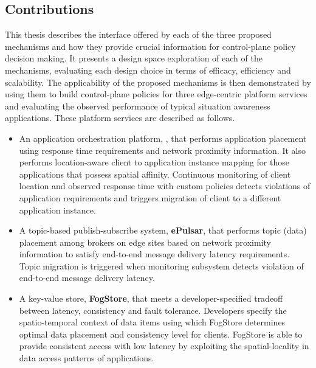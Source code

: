 \subsection{Contributions}
This thesis describes the interface offered by each of the three proposed mechanisms and how they provide crucial information for control-plane policy decision making. It presents a design space exploration of each of the mechanisms, evaluating each design choice in terms of efficacy, efficiency and scalability. The applicability of the proposed mechanisms is then demonstrated by using them to build control-plane policies for three edge-centric platform services and evaluating the observed performance of typical situation awareness applications. These platform services are described as follows.
\begin{itemize}
\item An application orchestration platform, \oneedge{}, that performs application placement using response time requirements and network proximity information. It also performs location-aware client to application instance mapping for those applications that possess spatial affinity. Continuous monitoring of client location and observed response time with custom policies detects violations of application requirements and triggers migration of client to a different application instance. 
\item A topic-based publish-subscribe system, \textbf{ePulsar}, that performs topic (data) placement among brokers on edge sites based on network proximity information to satisfy end-to-end message delivery latency requirements. Topic migration is triggered when monitoring subsystem detects violation of end-to-end message delivery latency.
\item A key-value store, \textbf{FogStore}, that meets a developer-specified tradeoff between latency, consistency and fault tolerance. Developers specify the spatio-temporal context of data items using which FogStore determines optimal data placement and consistency level for clients. FogStore is able to provide consistent access with low latency by exploiting the spatial-locality in data access patterns of applications. 
\end{itemize}

